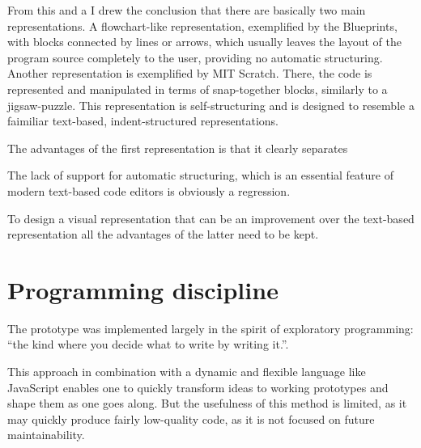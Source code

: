 From this and a I drew the conclusion that there are basically two main
representations. A flowchart-like representation, exemplified by the Blueprints,
with blocks connected by lines or arrows, which usually leaves the layout of the
program source completely to the user, providing no automatic
structuring. Another representation is exemplified by MIT Scratch. There, the
code is represented and manipulated in terms of snap-together blocks, similarly
to a jigsaw-puzzle. This representation is self-structuring and is designed to
resemble a faimiliar text-based, indent-structured representations.

The advantages of the first representation is that it clearly separates

The lack of support for automatic structuring, which is an essential feature of
modern text-based code editors is obviously a regression.

To design a visual representation that can be an improvement over the text-based
representation all the advantages of the latter need to be kept.


\section{Programming discipline}
The prototype was implemented largely in the spirit of exploratory programming:
``the kind where you decide what to write by writing
it.''\cite{arc}.

This approach in combination with a dynamic and flexible language like
JavaScript enables one to quickly transform ideas to working prototypes and
shape them as one goes along. But the usefulness of this method is limited, as
it may quickly produce fairly low-quality code, as it is not focused on future
maintainability.
